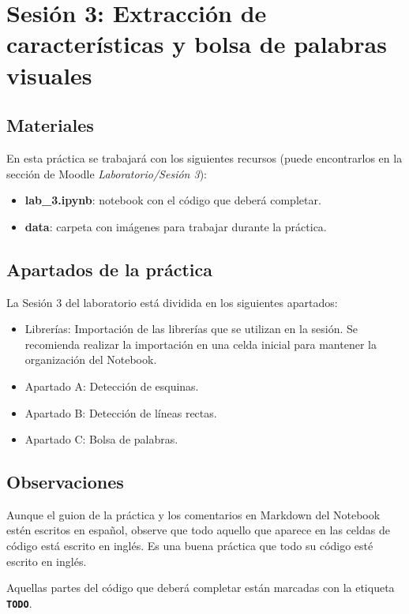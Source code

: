 \chapter{Sesión 3: Extracción de características y bolsa de palabras visuales}
\label{chapter:introduction_ses_3}

\section{Materiales}

En esta práctica se trabajará con los siguientes recursos (puede encontrarlos en la sección de Moodle \textit{Laboratorio/Sesión 3}):

\begin{itemize}
    \item \textbf{lab\_3.ipynb}: notebook con el código que deberá completar.
    \item \textbf{data}: carpeta con imágenes para trabajar durante la práctica.
\end{itemize}

\section{Apartados de la práctica}

La Sesión 3 del laboratorio está dividida en los siguientes apartados:

\begin{itemize}
    \item Librerías: Importación de las librerías que se utilizan en la sesión. Se recomienda realizar la importación en una celda inicial para mantener la organización del Notebook.
    \item Apartado A: Detección de esquinas.
    \item Apartado B: Detección de líneas rectas.
    \item Apartado C: Bolsa de palabras.
\end{itemize}

\section{Observaciones}

Aunque el guion de la práctica y los comentarios en Markdown del Notebook estén escritos en español, observe que todo aquello que aparece en las celdas de código está escrito en inglés. Es una buena práctica que todo su código esté escrito en inglés.

Aquellas partes del código que deberá completar están marcadas con la etiqueta \textbf{\texttt{TODO}}.

